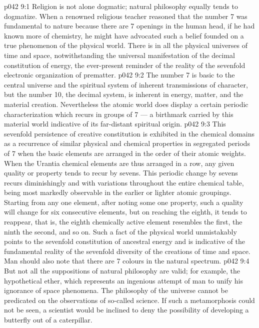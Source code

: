 \vs p042 9:1 Religion is not alone dogmatic; natural philosophy equally tends to dogmatize. When a renowned religious teacher reasoned that the number 7 was fundamental to nature because there are 7 openings in the human head, if he had known more of chemistry, he might have advocated such a belief founded on a true phenomenon of the physical world. There is in all the physical universes of time and space, notwithstanding the universal manifestation of the decimal constitution of energy, the ever\hyp{}present reminder of the reality of the sevenfold electronic organization of prematter.
\vs p042 9:2 The number 7 is basic to the central universe and the spiritual system of inherent transmissions of character, but the number 10, the decimal system, is inherent in energy, matter, and the material creation. Nevertheless the atomic world does display a certain periodic characterization which recurs in groups of 7 --- a birthmark carried by this material world indicative of its far\hyp{}distant spiritual origin.
\vs p042 9:3 This sevenfold persistence of creative constitution is exhibited in the chemical domains as a recurrence of similar physical and chemical properties in segregated periods of 7 when the basic elements are arranged in the order of their atomic weights. When the Urantia chemical elements are thus arranged in a row, any given quality or property tends to recur by sevens. This periodic change by sevens recurs diminishingly and with variations throughout the entire chemical table, being most markedly observable in the earlier or lighter atomic groupings. Starting from any one element, after noting some one property, such a quality will change for six consecutive elements, but on reaching the eighth, it tends to reappear, that is, the eighth chemically active element resembles the first, the ninth the second, and so on. Such a fact of the physical world unmistakably points to the sevenfold constitution of ancestral energy and is indicative of the fundamental reality of the sevenfold diversity of the creations of time and space. Man should also note that there are 7 colours in the natural spectrum.
\vs p042 9:4 But not all the suppositions of natural philosophy are valid; for example, the hypothetical ether, which represents an ingenious attempt of man to unify his ignorance of space phenomena. The philosophy of the universe cannot be predicated on the observations of so\hyp{}called science. If such a metamorphosis could not be seen, a scientist would be inclined to deny the possibility of developing a butterfly out of a caterpillar.
